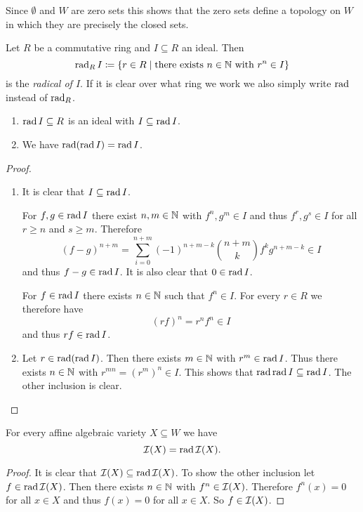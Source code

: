 \begin{rem}
 Since $\emptyset$ and $W$ are zero sets this shows that the zero sets define a topology on $W$ in which they are precisely the closed sets.
\end{rem}


\begin{defi}
 Let $R$ be a commutative ring and $I \subseteq R$ an ideal. Then
 \[
  \operatorname{rad}_R I \coloneqq \{r \in R \mid \text{there exists } n \in \mathbb{N} \text{ with } r^n \in I\}
 \]
 is the \emph{radical of $I$}. If it is clear over what ring we work we also simply write $\operatorname{rad}$ instead of $\operatorname{rad}_R$.
\end{defi}


\begin{lem}
 \begin{enumerate}[label=\emph{\alph*)},leftmargin=*]
  Let $R$ be a commutative ring and $I \subseteq R$ an ideal. 
  \item
   $\operatorname{rad} I  \subseteq R$ is an ideal with $I \subseteq \operatorname{rad} I$.
  \item
   We have $\operatorname{rad}(\operatorname{rad} I) = \operatorname{rad} I$.
 \end{enumerate}
\end{lem}
\begin{proof}
 \begin{enumerate}[label=\emph{\alph*)},leftmargin=*]
  \item
   It is clear that $I \subseteq \operatorname{rad} I$.
   
   For $f,g \in \operatorname{rad} I$ there exist $n,m \in \mathbb{N}$ with $f^n, g^m \in I$ and thus $f^r, g^s \in I$ for all $r \geq n$ and $s \geq m$. Therefore
   \[
    (f-g)^{n+m} = \sum_{i=0}^{n+m} (-1)^{n+m-k} \binom{n+m}{k} f^k g^{n+m-k} \in I
   \]
   and thus $f-g \in \operatorname{rad} I$. It is also clear that $0 \in \operatorname{rad} I$.
   
   For $f \in \operatorname{rad} I$ there exists $n \in \mathbb{N}$ such that $f^n \in I$. For every $r \in R$ we therefore have
   \[
    (rf)^n = r^n f^n \in I
   \]
   and thus $rf \in \operatorname{rad} I$.
  \item
   Let $r \in \operatorname{rad}(\operatorname{rad} I)$. Then there exists $m \in \mathbb{N}$ with $r^m \in \operatorname{rad} I$. Thus there exists $n \in \mathbb{N}$ with $r^{mn} = (r^m)^n \in I$. This shows that $\operatorname{rad} \operatorname{rad} I \subseteq \operatorname{rad} I$. The other inclusion is clear.
  \qedhere
 \end{enumerate}
\end{proof}


\begin{lem}
 For every affine algebraic variety $X \subseteq W$ we have
 \[
 \mathcal{I}(X) = \operatorname{rad} \mathcal{I}(X).
 \]
\end{lem}
\begin{proof}
 It is clear that $\mathcal{I}(X) \subseteq \operatorname{rad} \mathcal{I}(X)$. To show the other inclusion let \mbox{$f \in \operatorname{rad} \mathcal{I}(X)$}. Then there exists $n \in \mathbb{N}$ with $f^n \in \mathcal{I}(X)$. Therefore $f^n(x) = 0$ for all $x \in X$ and thus $f(x) = 0$ for all $x \in X$. So $f \in \mathcal{I}(X)$.
\end{proof}


